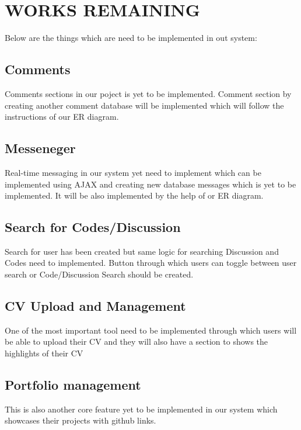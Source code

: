 \chapter{WORKS REMAINING} 
Below are the things which are need to be implemented in out system:
\section{Comments}
Comments sections in our poject is yet to be implemented. Comment section by creating another comment database will be implemented which will follow the instructions of our ER diagram.
\section{Messeneger}
Real-time messaging in our system yet need to implement which can be implemented using AJAX and creating new database messages which is yet to be implemented. It will be also implemented by the help of or ER diagram.
\section{Search for Codes/Discussion}
Search for user has been created but same logic for searching Discussion and Codes need to implemented. Button through which users can toggle between user search or Code/Discussion Search should be created.
\section{CV Upload and Management}
One of the most important tool need to be implemented through which users will be able to upload their CV and they will also have a section to shows the highlights of their CV
\section{Portfolio management}
This is also another core feature yet to be implemented in our system which showcases their projects with github links.
